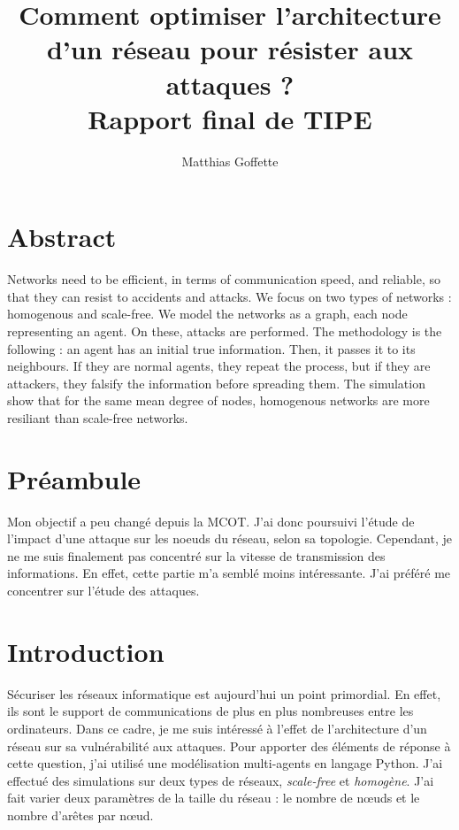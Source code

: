 \documentclass[12pt,a4paper]{article}
\title{Comment optimiser l'architecture d'un réseau pour résister aux attaques ?\\
  Rapport final de TIPE}
\author{Matthias Goffette}
\begin{document}
\maketitle

\section{Abstract} %

	Networks need to be efficient, in terms of communication speed, and reliable, so that they can resist to accidents and attacks. We focus on two types of networks : homogenous and scale-free. We model the networks as a graph, each node representing an agent. On these, attacks are performed. The methodology is the following : an agent has an initial true information. Then, it passes it to its neighbours. If they are normal agents, they repeat the process, but if they are attackers, they falsify the information before spreading them. The simulation show that for the same mean degree of nodes, homogenous networks are more resiliant than scale-free networks.



\section{Préambule} %

	Mon objectif a peu changé depuis la MCOT. J'ai donc poursuivi l'étude de l'impact d'une attaque sur les noeuds du réseau, selon sa topologie. Cependant, je ne me suis finalement pas concentré sur la vitesse de transmission des informations. En effet, cette partie m'a semblé moins intéressante. J'ai préféré me concentrer sur l'étude des attaques.


\section{Introduction} %


Sécuriser les réseaux informatique est aujourd'hui un point primordial.
En effet, ils sont le support de communications de plus en plus nombreuses entre les ordinateurs.
Dans ce cadre, je me suis intéressé à l'effet de l'architecture d'un réseau sur sa vulnérabilité aux attaques.
Pour apporter des éléments de réponse à cette question, j'ai utilisé une modélisation multi-agents en langage Python.
J'ai effectué des simulations sur deux types de réseaux, \emph{scale-free} et \emph{homogène}.
J'ai fait varier deux paramètres de la taille du réseau : le nombre de nœuds et le nombre d'arêtes par nœud.  
\end{document}
